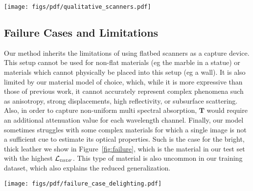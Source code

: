 \begin{figure*}[tb!]
	\centering
	\texttt{[image: figs/pdf/qualitative\_scanners.pdf]}
	\caption{Qualitative comparison between several flatbed scanners for the same material. Note that the images are not exactly pixel-wise coherent across scanners. }
	\label{fig:qualitative_scanners}
\end{figure*}



\subsection{\textbf{Failure Cases and Limitations}} 

Our method inherits the limitations of using flatbed scanners as a capture device. This setup cannot be used for non-flat materials (eg the marble in a statue) or materials which cannot physically be placed into this setup (eg a wall). It is also limited by our material model of choice, which, while it is more expressive than those of previous work, it cannot accurately represent complex phenomena such as anisotropy, strong displacements, high reflectivity, or subsurface scattering. Also, in order to capture non-uniform multi spectral absorption, $\mathbf{T}$ would require an additional attenuation value for each wavelength channel. Finally, our model sometimes struggles with some complex materials for which a single image is not a sufficient cue to estimate its optical properties. Such is the case for the bright, thick leather we show in Figure~\ref{fig:failure}, which is the material in our test set with the highest $\mathcal{L}_{\text{\tiny{BSDF}}}$.%
This type of material is also uncommon in our training dataset, which also explains the reduced generalization.




\begin{figure*}[tb!]
	\centering
	\texttt{[image: figs/pdf/failure\_case\_delighting.pdf]}
	\caption{A failure case of our method. For the input image on the right, we show the ground truth albedo, normals, specular, roughness, transmittance and opacity maps (top row), and our model estimations. }
	\label{fig:failure}
\end{figure*}
